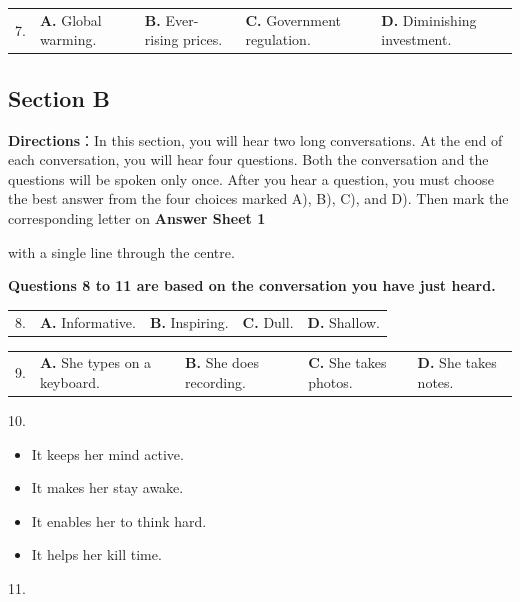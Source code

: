\documentclass[UTF8,11pt]{ctexart}
\begin{document}
\noindent\begin{tabularx}{\linewidth}{@{}lXXXX@{}}7. & \textbf{A.} Global warming. & \textbf{B.} Ever-rising prices. & \textbf{C.} Government regulation. & \textbf{D.} Diminishing investment.\\\end{tabularx}\par

\subsection*{\textbf{Section B}}


\textbf{Directions}：In this section, you will hear two long conversations. At the end of each conversation, you will hear four questions. Both the conversation and the questions will be spoken only once. After you hear a question, you must choose the best answer from the four choices marked A), B), C), and D). Then mark the corresponding letter on\textbf{ Answer Sheet 1}


with a single line through the centre.


\textbf{Questions 8 to 11 are based on the conversation you have just heard.}


\noindent\begin{tabularx}{\linewidth}{@{}lXXXX@{}}8. & \textbf{A.} Informative. & \textbf{B.} Inspiring. & \textbf{C.} Dull. & \textbf{D.} Shallow.\\\end{tabularx}\par

\noindent\begin{tabularx}{\linewidth}{@{}lXXXX@{}}9. & \textbf{A.} She types on a keyboard. & \textbf{B.} She does recording. & \textbf{C.} She takes photos. & \textbf{D.} She takes notes.\\\end{tabularx}\par

10.


\begin{itemize}[leftmargin=2em,itemsep=.2em,topsep=.4em]\item[A.] It keeps her mind active.
\item[B.] It makes her stay awake.
\item[C.] It enables her to think hard.
\item[D.] It helps her kill time.
\end{itemize}

11.
\end{document}
